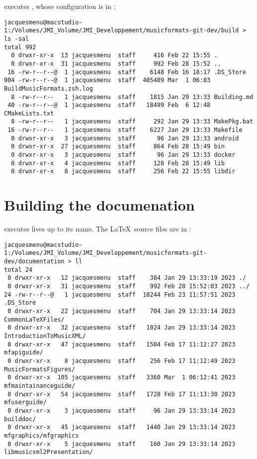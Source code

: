  executes \cmake, whose configuration is in \buildFolder:
\begin{lstlisting}[language=Terminal]
jacquesmenu@macstudio-1:/Volumes/JMI_Volume/JMI_Developpement/musicformats-git-dev/build > ls -sal
total 992
  0 drwxr-xr-x  13 jacquesmenu  staff     416 Feb 22 15:55 .
  0 drwxr-xr-x  31 jacquesmenu  staff     992 Feb 28 15:52 ..
 16 -rw-r--r--@  1 jacquesmenu  staff    6148 Feb 16 18:17 .DS_Store
904 -rw-r--r--@  1 jacquesmenu  staff  405409 Mar  1 06:03 BuildMusicFormats.zsh.log
  8 -rw-r--r--   1 jacquesmenu  staff    1815 Jan 29 13:33 Building.md
 40 -rw-r--r--@  1 jacquesmenu  staff   18499 Feb  6 12:48 CMakeLists.txt
  8 -rw-r--r--   1 jacquesmenu  staff     292 Jan 29 13:33 MakePkg.bat
 16 -rw-r--r--   1 jacquesmenu  staff    6227 Jan 29 13:33 Makefile
  0 drwxr-xr-x   3 jacquesmenu  staff      96 Jan 29 13:33 android
  0 drwxr-xr-x  27 jacquesmenu  staff     864 Feb 28 15:49 bin
  0 drwxr-xr-x   3 jacquesmenu  staff      96 Jan 29 13:33 docker
  0 drwxr-xr-x   4 jacquesmenu  staff     128 Feb 28 15:49 lib
  0 drwxr-xr-x   8 jacquesmenu  staff     256 Feb 22 15:55 libdir
\end{lstlisting}


\section{Building the documenation}

 executes lives up to its name. The \LaTeX\ source files are in \docFolder:
\begin{lstlisting}[language=Terminal]
jacquesmenu@macstudio-1:/Volumes/JMI_Volume/JMI_Developpement/musicformats-git-dev/documentation > ll
total 24
 0 drwxr-xr-x   12 jacquesmenu  staff    384 Jan 29 13:33:19 2023 ./
 0 drwxr-xr-x   31 jacquesmenu  staff    992 Feb 28 15:52:03 2023 ../
24 -rw-r--r--@   1 jacquesmenu  staff  10244 Feb 23 11:57:51 2023 .DS_Store
 0 drwxr-xr-x   22 jacquesmenu  staff    704 Jan 29 13:33:14 2023 CommonLaTeXFiles/
 0 drwxr-xr-x   32 jacquesmenu  staff   1024 Jan 29 13:33:14 2023 IntroductionToMusicXML/
 0 drwxr-xr-x   47 jacquesmenu  staff   1504 Feb 17 11:12:27 2023 mfapiguide/
 0 drwxr-xr-x    8 jacquesmenu  staff    256 Feb 17 11:12:49 2023 MusicFormatsFigures/
 0 drwxr-xr-x  105 jacquesmenu  staff   3360 Mar  1 06:12:41 2023 mfmaintainanceguide/
 0 drwxr-xr-x   54 jacquesmenu  staff   1728 Feb 17 11:13:30 2023 mfuserguide/
 0 drwxr-xr-x    3 jacquesmenu  staff     96 Jan 29 13:33:14 2023 builddoc/
 0 drwxr-xr-x   45 jacquesmenu  staff   1440 Jan 29 13:33:14 2023 mfgraphics/mfgraphics
 0 drwxr-xr-x    5 jacquesmenu  staff    160 Jan 29 13:33:14 2023 libmusicxml2Presentation/
\end{lstlisting}

